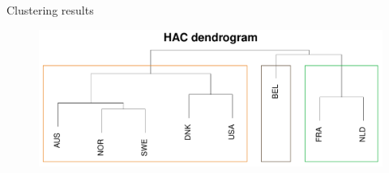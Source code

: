 \documentclass[10pt, handout]{beamer}
\begin{document}
\begin{frame}{Clustering results}
	\begin{figure}
		\includegraphics[width=1\textwidth]{plots//VOC/dendrogram}
	\end{figure}
\end{frame}
\end{document}
